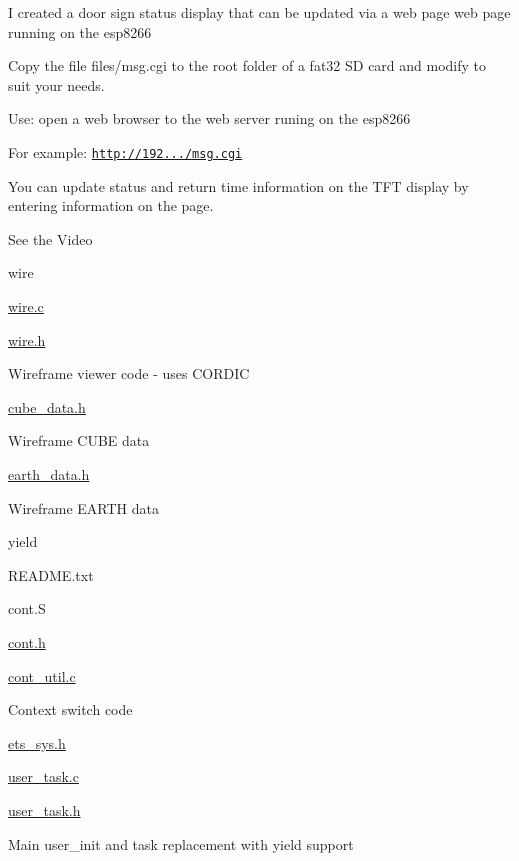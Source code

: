 I created a door sign status display that can be updated via a web page web page running on the esp8266
\begin{DoxyItemize}
\item Copy the file files/msg.\-cgi to the root folder of a fat32 S\-D card and modify to suit your needs.
\item Use\-: open a web browser to the web server runing on the esp8266
\begin{DoxyItemize}
\item For example\-: \href{http://192.168.200.116/msg.cgi}{\tt http\-://192.../msg.\-cgi}
\item You can update status and return time information on the T\-F\-T display by entering information on the page.
\end{DoxyItemize}
\item See the Video
\end{DoxyItemize}

wire
\begin{DoxyItemize}
\item \hyperlink{wire_8c}{wire.\-c}
\item \hyperlink{wire_8h}{wire.\-h}
\begin{DoxyItemize}
\item Wireframe viewer code -\/ uses C\-O\-R\-D\-I\-C
\end{DoxyItemize}
\item \hyperlink{cube__data_8h}{cube\-\_\-data.\-h}
\begin{DoxyItemize}
\item Wireframe C\-U\-B\-E data
\end{DoxyItemize}
\item \hyperlink{earth__data_8h}{earth\-\_\-data.\-h}
\begin{DoxyItemize}
\item Wireframe E\-A\-R\-T\-H data
\end{DoxyItemize}
\end{DoxyItemize}

yield
\begin{DoxyItemize}
\item R\-E\-A\-D\-M\-E.\-txt
\item cont.\-S
\item \hyperlink{cont_8h}{cont.\-h}
\item \hyperlink{cont__util_8c}{cont\-\_\-util.\-c}
\begin{DoxyItemize}
\item Context switch code
\end{DoxyItemize}
\item \hyperlink{ets__sys_8h}{ets\-\_\-sys.\-h}
\item \hyperlink{user__task_8c}{user\-\_\-task.\-c}
\item \hyperlink{user__task_8h}{user\-\_\-task.\-h}
\begin{DoxyItemize}
\item Main user\-\_\-init and task replacement with yield support
\end{DoxyItemize}
\end{DoxyItemize}

